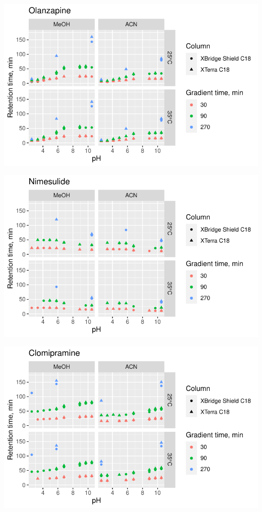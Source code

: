 \documentclass[
  letterpaper,
  DIV=11,
  numbers=noendperiod]{scrreprt}
\begin{document}
\includegraphics{index_files/figure-pdf/unnamed-chunk-4-21.pdf}

\includegraphics{index_files/figure-pdf/unnamed-chunk-4-22.pdf}

\includegraphics{index_files/figure-pdf/unnamed-chunk-4-23.pdf}
\end{document}
